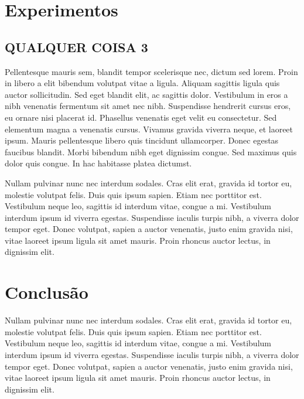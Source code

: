 \documentclass[10pt,twocolumn,letterpaper]{article}
\begin{document}

\section{Experimentos}

\subsection{QUALQUER COISA 3}
Pellentesque mauris sem, blandit tempor scelerisque nec, dictum sed lorem. Proin in libero a elit bibendum volutpat vitae a ligula. Aliquam sagittis ligula quis auctor sollicitudin. Sed eget blandit elit, ac sagittis dolor. Vestibulum in eros a nibh venenatis fermentum sit amet nec nibh. Suspendisse hendrerit cursus eros, eu ornare nisi placerat id. Phasellus venenatis eget velit eu consectetur. Sed elementum magna a venenatis cursus. Vivamus gravida viverra neque, et laoreet ipsum. Mauris pellentesque libero quis tincidunt ullamcorper. Donec egestas faucibus blandit. Morbi bibendum nibh eget dignissim congue. Sed maximus quis dolor quis congue. In hac habitasse platea dictumst.

Nullam pulvinar nunc nec interdum sodales. Cras elit erat, gravida id tortor eu, molestie volutpat felis. Duis quis ipsum sapien. Etiam nec porttitor est. Vestibulum neque leo, sagittis id interdum vitae, congue a mi. Vestibulum interdum ipsum id viverra egestas. Suspendisse iaculis turpis nibh, a viverra dolor tempor eget. Donec volutpat, sapien a auctor venenatis, justo enim gravida nisi, vitae laoreet ipsum ligula sit amet mauris. Proin rhoncus auctor lectus, in dignissim elit.

\section{Conclusão}

Nullam pulvinar nunc nec interdum sodales. Cras elit erat, gravida id tortor eu, molestie volutpat felis. Duis quis ipsum sapien. Etiam nec porttitor est. Vestibulum neque leo, sagittis id interdum vitae, congue a mi. Vestibulum interdum ipsum id viverra egestas. Suspendisse iaculis turpis nibh, a viverra dolor tempor eget. Donec volutpat, sapien a auctor venenatis, justo enim gravida nisi, vitae laoreet ipsum ligula sit amet mauris. Proin rhoncus auctor lectus, in dignissim elit.


{\small


}
\end{document}
